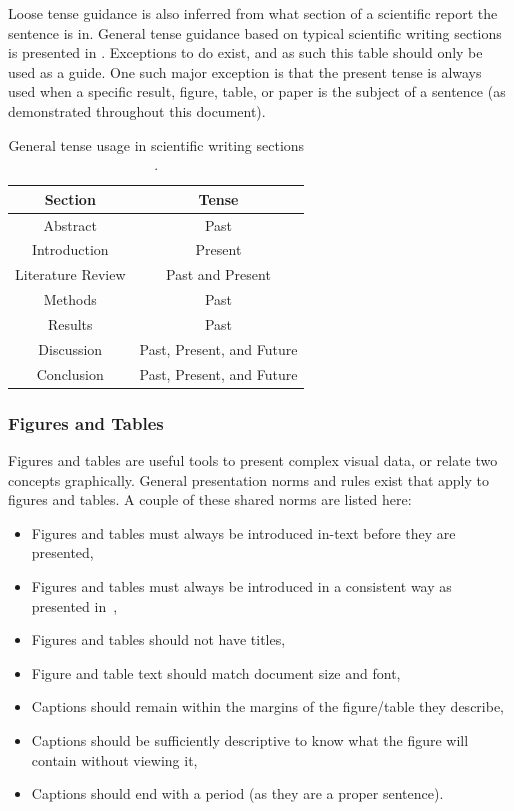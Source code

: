\noindent
Loose tense guidance is also inferred from what section of a scientific report the sentence is in. 
General tense guidance based on typical scientific writing sections is presented in . 
Exceptions to  do exist, and as such this table should only be used as a guide. 
One such major exception is that the present tense is always used when a specific result, figure, table, or paper is the subject of a sentence (as demonstrated throughout this document). 

\begin{table}[hbt!]
	\centering
	\begin{threeparttable}[b]
		\caption{General tense usage in scientific writing sections \cite{tenseScientificWriting}. \label{tab:tenseBasedOnSection}}
		\begin{tabular}{cc}
			\toprule
			\textbf{Section} & \textbf{Tense} \\ \midrule
			Abstract & Past \\
			Introduction & Present \\
			Literature Review & Past and Present \\
			Methods & Past \\
			Results & Past \\
			Discussion & Past, Present, and Future \\
			Conclusion & Past, Present, and Future \\ \bottomrule
		\end{tabular}
	\end{threeparttable}
\end{table}


\subsubsection{Figures and Tables} \label{sec:documentSetupFigureTableRules}

Figures and tables are useful tools to present complex visual data, or relate two concepts graphically. 
General presentation norms and rules exist that apply to figures and tables.  
A couple of these shared norms are listed here: 
\begin{itemize}
	\item Figures and tables must always be introduced in-text before they are presented, 
	\item Figures and tables must always be introduced in a consistent way as presented in~, 
	\item Figures and tables should not have titles, 
	\item Figure and table text should match document size and font, 
	\item Captions should remain within the margins of the figure/table they describe, 
	\item Captions should be sufficiently descriptive to know what the figure will contain without viewing it, 
	\item Captions should end with a period (as they are a proper sentence).
\end{itemize}

